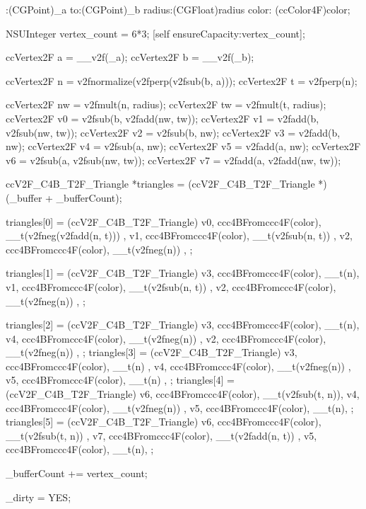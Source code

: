 \begin{DoxyCode}
                      :(CGPoint)_a to:(CGPoint)_b radius:(CGFloat)radius color:
      (ccColor4F)color;
{
        NSUInteger vertex_count = 6*3;
        [self ensureCapacity:vertex_count];
        
        ccVertex2F a = __v2f(_a);
        ccVertex2F b = __v2f(_b);
        
        
        ccVertex2F n = v2fnormalize(v2fperp(v2fsub(b, a)));
        ccVertex2F t = v2fperp(n);
        
        ccVertex2F nw = v2fmult(n, radius);
        ccVertex2F tw = v2fmult(t, radius);
        ccVertex2F v0 = v2fsub(b, v2fadd(nw, tw));
        ccVertex2F v1 = v2fadd(b, v2fsub(nw, tw));
        ccVertex2F v2 = v2fsub(b, nw);
        ccVertex2F v3 = v2fadd(b, nw);
        ccVertex2F v4 = v2fsub(a, nw);
        ccVertex2F v5 = v2fadd(a, nw);
        ccVertex2F v6 = v2fsub(a, v2fsub(nw, tw));
        ccVertex2F v7 = v2fadd(a, v2fadd(nw, tw));
        
        
        ccV2F_C4B_T2F_Triangle *triangles = (ccV2F_C4B_T2F_Triangle *)(_buffer 
      + _bufferCount);
        
        triangles[0] = (ccV2F_C4B_T2F_Triangle) {
                {v0, ccc4BFromccc4F(color), __t(v2fneg(v2fadd(n, t))) },
                {v1, ccc4BFromccc4F(color), __t(v2fsub(n, t)) },
                {v2, ccc4BFromccc4F(color), __t(v2fneg(n)) },
        };
        
        triangles[1] = (ccV2F_C4B_T2F_Triangle){
                {v3, ccc4BFromccc4F(color), __t(n)},
                {v1, ccc4BFromccc4F(color), __t(v2fsub(n, t)) },
                {v2, ccc4BFromccc4F(color), __t(v2fneg(n)) },
        };
        
        triangles[2] = (ccV2F_C4B_T2F_Triangle){
                {v3, ccc4BFromccc4F(color), __t(n)},
                {v4, ccc4BFromccc4F(color), __t(v2fneg(n)) },
                {v2, ccc4BFromccc4F(color), __t(v2fneg(n)) },
        };
        triangles[3] = (ccV2F_C4B_T2F_Triangle){
                {v3, ccc4BFromccc4F(color), __t(n) }, 
                {v4, ccc4BFromccc4F(color), __t(v2fneg(n)) },
                {v5, ccc4BFromccc4F(color), __t(n) },
        };
        triangles[4] = (ccV2F_C4B_T2F_Triangle){
                {v6, ccc4BFromccc4F(color), __t(v2fsub(t, n))},
                {v4, ccc4BFromccc4F(color), __t(v2fneg(n)) },
                {v5, ccc4BFromccc4F(color), __t(n)},
        };
        triangles[5] = (ccV2F_C4B_T2F_Triangle){
                {v6, ccc4BFromccc4F(color), __t(v2fsub(t, n)) },
                {v7, ccc4BFromccc4F(color), __t(v2fadd(n, t)) },
                {v5, ccc4BFromccc4F(color), __t(n)},
        };
        
        _bufferCount += vertex_count;
        
        _dirty = YES;
}
\end{DoxyCode}


